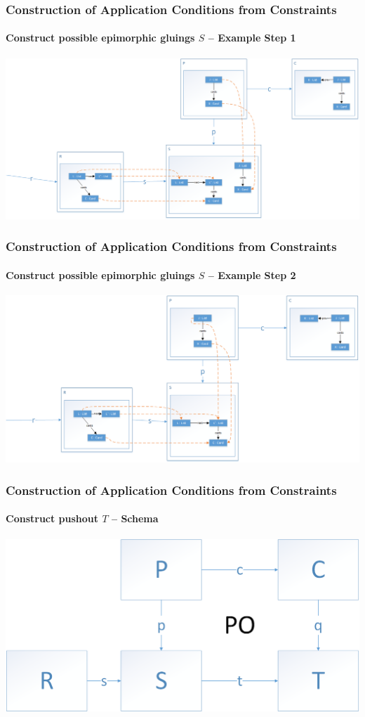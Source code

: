 \documentclass[32pt,t]{beamer}
\begin{document}
	\begin{frame}
		\frametitle{Construction of Application Conditions from Constraints}
		\framesubtitle{Construct possible epimorphic gluings $S$ -- Example Step 1}
		\centering
		\includegraphics[width=\linewidth]{Images/11_Construct_S_Example_Step1}
	\end{frame}
	
	\begin{frame}
		\frametitle{Construction of Application Conditions from Constraints}
		\framesubtitle{Construct possible epimorphic gluings $S$ -- Example Step 2}
		\centering
		\includegraphics[width=\linewidth]{Images/12_Construct_S_Example_Step2}
	\end{frame}

	\begin{frame}
		\frametitle{Construction of Application Conditions from Constraints}
		\framesubtitle{Construct pushout $T$ -- Schema}
		\centering
		\includegraphics[width=\linewidth]{Images/20_Construct_T_Schema}
	\end{frame}
\end{document}
